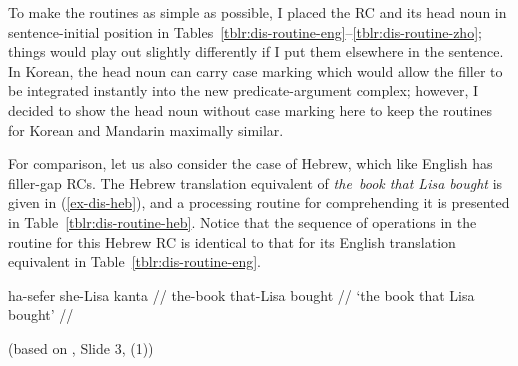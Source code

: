 To make the routines as simple as possible, I placed the RC and its head noun in sentence-initial position in Tables~\ref{tblr:dis-routine-eng}--\ref{tblr:dis-routine-zho}; things would play out slightly differently if I put them elsewhere in the sentence. In Korean, the head noun can carry case marking which would allow the filler to be integrated instantly into the new predicate-argument complex; however, I decided to show the head noun without case marking here to keep the routines for Korean and Mandarin maximally similar.

For comparison, let us also consider the case of Hebrew, which like English has filler-gap RCs. The Hebrew translation equivalent of \textit{the~book that Lisa bought} is given in (\ref{ex-dis-heb}), and a processing routine for comprehending it is presented in Table~\ref{tblr:dis-routine-heb}. Notice that the sequence of operations in the routine for this Hebrew RC is identical to that for its English translation equivalent in Table~\ref{tblr:dis-routine-eng}.


\ex
\begingl 
\gla ha-sefer she-Lisa kanta // \label{ex-dis-heb}
\glb the-book that-Lisa bought //
\glft `the book that Lisa bought' //
\endgl\par\nobreak\vspace{5pt}
\hfill (based on \cite{koesterich.meltzer-asscher2022}, Slide 3, (1))
\vspace{-12pt}
\xe 

